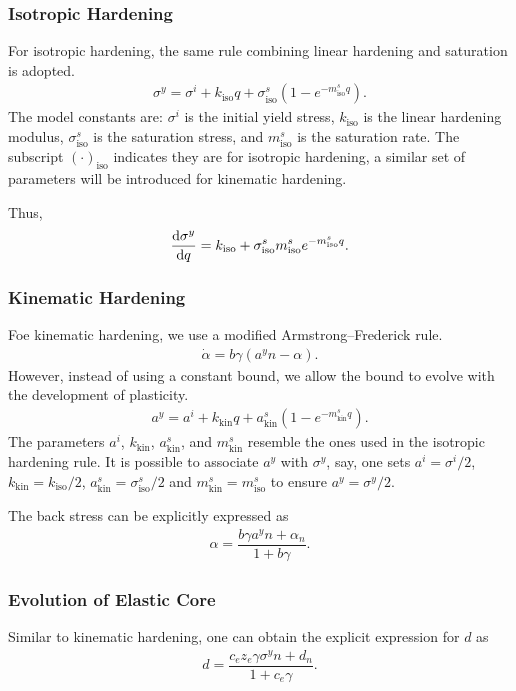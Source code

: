 \subsubsection{Isotropic Hardening}
For isotropic hardening, the same rule combining linear hardening and saturation is adopted.
\begin{gather}
    \sigma^y=\sigma^i+k_\text{iso}q+\sigma^s_\text{iso}\left(1-e^{-m^s_\text{iso}q}\right).
\end{gather}
The model constants are: $\sigma^i$ is the initial yield stress, $k_\text{iso}$ is the linear hardening modulus, $\sigma^s_\text{iso}$ is the saturation stress, and $m^s_\text{iso}$ is the saturation rate.
The subscript $\left(\cdot\right)_\text{iso}$ indicates they are for isotropic hardening, a similar set of parameters will be introduced for kinematic hardening.

Thus,
\begin{gather}
\dfrac{\mathrm{d}\sigma^y}{\mathrm{d}q}=k_\text{iso}+\sigma^s_\text{iso}m^s_\text{iso}e^{-m^s_\text{iso}q}.
\end{gather}
\subsubsection{Kinematic Hardening}
Foe kinematic hardening, we use a modified Armstrong--Frederick rule.
\begin{gather}
    \dot{\alpha}=b\gamma\left(a^yn-\alpha\right).
\end{gather}
However, instead of using a constant bound, we allow the bound to evolve with the development of plasticity.
\begin{gather}
    a^y=a^i+k_\text{kin}q+a^s_\text{kin}\left(1-e^{-m^s_\text{kin}q}\right).
\end{gather}
The parameters $a^i$, $k_\text{kin}$, $a^s_\text{kin}$, and $m^s_\text{kin}$ resemble the ones used in the isotropic hardening rule.
It is possible to associate $a^y$ with $\sigma^y$, say, one sets $a^i=\sigma^i/2$, $k_\text{kin}=k_\text{iso}/2$, $a^s_\text{kin}=\sigma^s_\text{iso}/2$ and $m^s_\text{kin}=m^s_\text{iso}$ to ensure $a^y=\sigma^y/2$.

The back stress can be explicitly expressed as
\begin{gather}
    \alpha=\dfrac{b\gamma{}a^yn+\alpha_n}{1+b\gamma}.
\end{gather}
\subsubsection{Evolution of Elastic Core}
Similar to kinematic hardening, one can obtain the explicit expression for $d$ as
\begin{gather}
d=\dfrac{c_ez_e\gamma\sigma^yn+d_n}{1+c_e\gamma}.
\end{gather}
